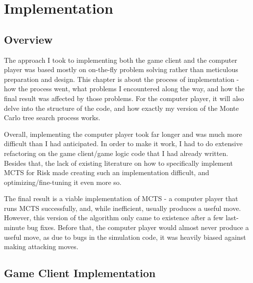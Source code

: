 \graphicspath{ {./Images/} }
\chapter{Implementation}
\label{implementation}
\section{Overview}
\label{implementationOverview}

The approach I took to implementing both the game client and the computer player was based mostly on on-the-fly problem solving rather than meticulous preparation and design. This chapter is about the process of implementation - how the process went, what problems I encountered along the way, and how the final result was affected by those problems. For the computer player, it will also delve into the structure of the code, and how exactly my version of the Monte Carlo tree search process works.

Overall, implementing the computer player took far longer and was much more difficult than I had anticipated. In order to make it work, I had to do extensive refactoring on the game client/game logic code that I had already written. Besides that, the lack of existing literature on how to specifically implement MCTS for Risk made creating such an implementation difficult, and optimizing/fine-tuning it even more so.

The final result is a viable implementation of MCTS - a computer player that runs MCTS successfully, and, while inefficient, usually produces a useful move. However, this version of the algorithm only came to existence after a few last-minute bug fixes. Before that, the computer player would almost never produce a useful move, as due to bugs in the simulation code, it was heavily biased against making attacking moves.


\section{Game Client Implementation}
\label{gameClientImplementation}
